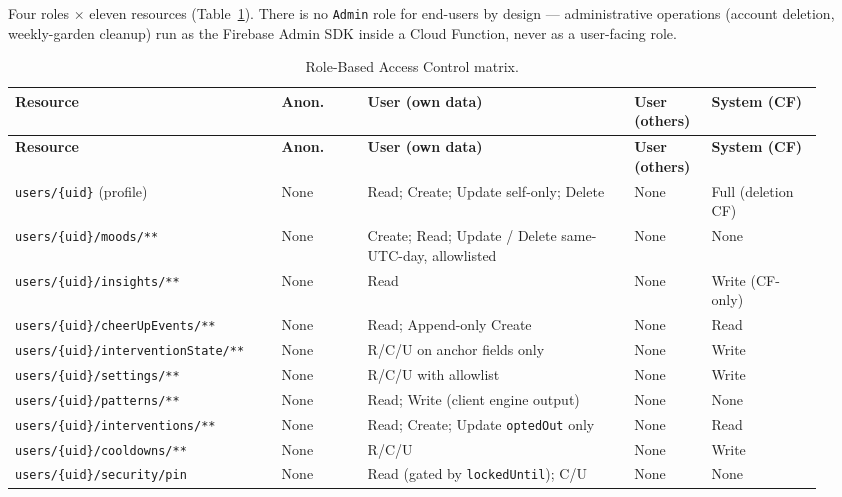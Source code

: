 \documentclass[11pt,a4paper]{article}
\begin{document}
Four roles $\times$ eleven resources (Table~\ref{tab:rbac}). There is no
\texttt{Admin} role for end-users by design --- administrative operations
(account deletion, weekly-garden cleanup) run as the Firebase Admin SDK
inside a Cloud Function, never as a user-facing role.
{\scriptsize
\renewcommand{\arraystretch}{1.20}
\begin{longtable}{@{} >{\raggedright\arraybackslash}p{0.31\linewidth} p{0.10\linewidth} >{\raggedright\arraybackslash}p{0.31\linewidth} p{0.09\linewidth} >{\raggedright\arraybackslash}p{0.13\linewidth} @{}}
\caption{Role-Based Access Control matrix.}\label{tab:rbac}\\
\toprule
\textbf{Resource} & \textbf{Anon.} & \textbf{User (own data)} & \textbf{User (others)} & \textbf{System (CF)} \\
\midrule
\endfirsthead
\toprule
\textbf{Resource} & \textbf{Anon.} & \textbf{User (own data)} & \textbf{User (others)} & \textbf{System (CF)} \\
\midrule
\endhead
\texttt{users/\allowbreak{}\{uid\}} (profile)                & None & Read; Create; Update self-only; Delete & None & Full (deletion CF) \\
\texttt{users/\allowbreak{}\{uid\}/\allowbreak{}moods/**}                 & None & Create; Read; Update / Delete same-UTC-day, allowlisted & None & None \\
\texttt{users/\allowbreak{}\{uid\}/\allowbreak{}insights/**}              & None & Read & None & Write (CF-only) \\
\texttt{users/\allowbreak{}\{uid\}/\allowbreak{}cheerUpEvents/**}         & None & Read; Append-only Create & None & Read \\
\texttt{users/\allowbreak{}\{uid\}/\allowbreak{}interventionState/**}     & None & R/C/U on anchor fields only & None & Write \\
\texttt{users/\allowbreak{}\{uid\}/\allowbreak{}settings/**}              & None & R/C/U with allowlist & None & Write \\
\texttt{users/\allowbreak{}\{uid\}/\allowbreak{}patterns/**}              & None & Read; Write (client engine output) & None & None \\
\texttt{users/\allowbreak{}\{uid\}/\allowbreak{}interventions/**}         & None & Read; Create; Update \texttt{optedOut} only & None & Read \\
\texttt{users/\allowbreak{}\{uid\}/\allowbreak{}cooldowns/**}             & None & R/C/U & None & Write \\
\texttt{users/\allowbreak{}\{uid\}/\allowbreak{}security/\allowbreak{}pin}             & None & Read (gated by \texttt{lockedUntil}); C/U & None & None \\

\end{longtable}}
\end{document}
